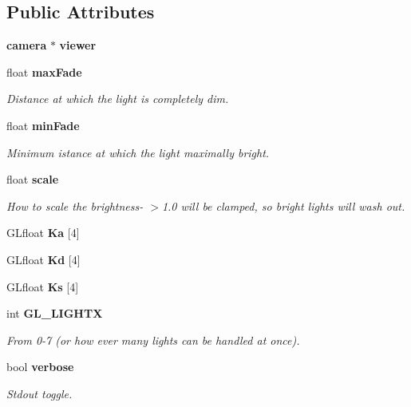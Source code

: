 \subsection*{Public Attributes}
\begin{CompactItemize}
\item 
{}
{\bf camera} $\ast$ {\bf viewer}\label{classlight_m0}

\item 
float {\bf max\-Fade}
\begin{CompactList}\small\item\em Distance at which the light is completely dim.\item\end{CompactList}\item 
{}
float {\bf min\-Fade}\label{classlight_m2}

\begin{CompactList}\small\item\em Minimum istance at which the light maximally bright.\item\end{CompactList}\item 
{}
float {\bf scale}\label{classlight_m3}

\begin{CompactList}\small\item\em How to scale the brightness- $>$1.0 will be clamped, so bright lights will wash out.\item\end{CompactList}\item 
GLfloat {\bf Ka} [4]
\item 
{}
GLfloat {\bf Kd} [4]\label{classlight_m5}

\item 
{}
GLfloat {\bf Ks} [4]\label{classlight_m6}

\item 
{}
int {\bf GL\_\-LIGHTX}\label{classlight_m7}

\begin{CompactList}\small\item\em From 0-7 (or how ever many lights can be handled at once).\item\end{CompactList}\item 
{}
bool {\bf verbose}\label{classlight_m8}

\begin{CompactList}\small\item\em Stdout toggle.\item\end{CompactList}\end{CompactItemize}


